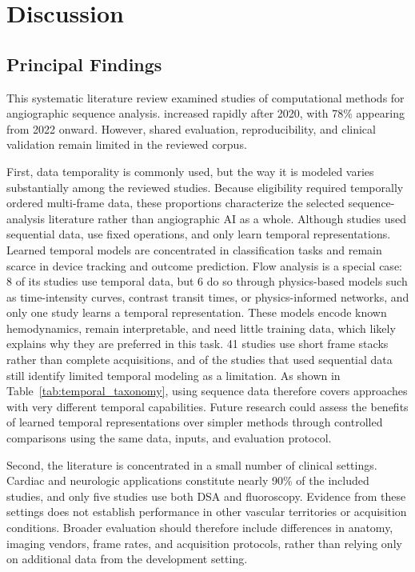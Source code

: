 \section{Discussion}\label{sec:discussion}

\subsection{Principal Findings}

This systematic literature review examined  studies of computational methods for angiographic sequence analysis.  increased rapidly after 2020, with 78\% appearing from 2022 onward. However, shared evaluation, reproducibility, and clinical validation remain limited in the reviewed corpus. 

First, data temporality is commonly used, but the way it is modeled varies substantially among the reviewed studies. Because eligibility required temporally ordered multi-frame data, these proportions characterize the selected sequence-analysis literature rather than angiographic AI as a whole. Although  studies  used sequential data,  use fixed operations, and only  learn temporal representations. Learned temporal models are concentrated in classification tasks and remain scarce in device tracking and outcome prediction. Flow analysis is a special case:  8 of its studies use temporal data, but 6 do so through physics-based models such as time-intensity curves, contrast transit times, or physics-informed networks, and only one study learns a temporal representation. These models encode known hemodynamics, remain interpretable, and need little training data, which likely explains why they are preferred in this task.  41 studies use short frame stacks rather than complete acquisitions, and  of the  studies that used sequential data still identify limited temporal modeling as a limitation. As shown in Table~\ref{tab:temporal_taxonomy}, using sequence data therefore covers approaches with very different temporal capabilities. Future research could assess the benefits of learned temporal representations over simpler methods through controlled comparisons using the same data, inputs, and evaluation protocol.

Second, the literature is concentrated in a small number of clinical settings. Cardiac and neurologic applications constitute nearly 90\% of the included studies, and only five studies use both DSA and fluoroscopy. Evidence from these settings does not establish performance in other vascular territories or acquisition conditions. Broader evaluation should therefore include differences in anatomy, imaging vendors, frame rates, and acquisition protocols, rather than relying only on additional data from the development setting.

